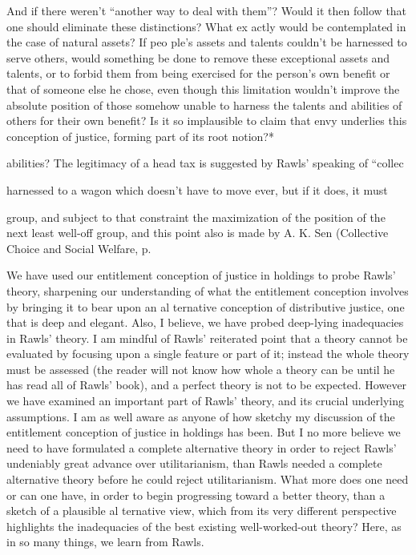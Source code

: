\documentclass[11pt,openany]{book}
\begin{document}
And if there weren't ``another way to deal with them''? Would it then follow that one should eliminate these distinctions? What ex actly would be contemplated in the case of natural assets? If peo ple's assets and talents couldn't be harnessed to serve others, would something be done to remove these exceptional assets and talents, or to forbid them from being exercised for the person's own benefit or that of someone else he chose, even though this limitation wouldn't improve the absolute position of those somehow unable to harness the talents and abilities of others for their own benefit? Is it so implausible to claim that envy underlies this conception of justice, forming part of its root notion?* 

abilities? The legitimacy of a head tax is suggested by Rawls' speaking of ``collec

harnessed to a wagon which doesn't have to move ever, but if it does, it must 

group, and subject to that constraint the maximization of the position of the next least well-off group, and this point also is made by A. K. Sen (Collective Choice and Social Welfare, p. 

We have used our entitlement conception of justice in holdings to probe Rawls' theory, sharpening our understanding of what the entitlement conception involves by bringing it to bear upon an al ternative conception of distributive justice, one that is deep and elegant. Also, I believe, we have probed deep-lying inadequacies in Rawls' theory. I am mindful of Rawls' reiterated point that a theory cannot be evaluated by focusing upon a single feature or part of it; instead the whole theory must be assessed (the reader will not know how whole a theory can be until he has read all of Rawls' book), and a perfect theory is not to be expected. However we have examined an important part of Rawls' theory, and its crucial underlying assumptions. I am as well aware as anyone of how sketchy my discussion of the entitlement conception of justice in holdings has been. But I no more believe we need to have formulated a complete alternative theory in order to reject Rawls' undeniably great advance over utilitarianism, than Rawls needed a complete alternative theory before he could reject utilitarianism. What more does one need or can one have, in order to begin progressing toward a better theory, than a sketch of a plausible al ternative view, which from its very different perspective highlights the inadequacies of the best existing well-worked-out theory? Here, as in so many things, we learn from Rawls. 
\end{document}
